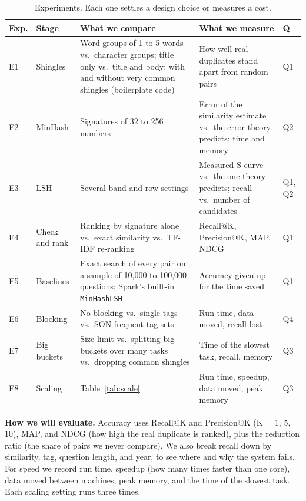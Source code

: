 \documentclass[11pt,a4paper]{article}
\begin{document}
\begin{table}[!t]
\centering
\caption{Experiments. Each one settles a design choice or measures a cost.}
\label{tab:exp}
\small
\begin{tabularx}{\textwidth}{@{}l l Y Y l@{}}
\toprule
\textbf{Exp.} & \textbf{Stage} & \textbf{What we compare} & \textbf{What we measure} & \textbf{Q} \\
\midrule
E1 & Shingles & Word groups of 1 to 5 words vs.\ character groups; title only vs.\ title and body; with and without very common shingles (boilerplate code) & How well real duplicates stand apart from random pairs & Q1 \\
E2 & MinHash & Signatures of 32 to 256 numbers & Error of the similarity estimate vs.\ the error theory predicts; time and memory & Q2 \\
E3 & LSH & Several band and row settings & Measured S-curve vs.\ the one theory predicts; recall vs.\ number of candidates & Q1, Q2 \\
E4 & Check and rank & Ranking by signature alone vs.\ exact similarity vs.\ TF-IDF re-ranking & Recall@K, Precision@K, MAP, NDCG & Q1 \\
E5 & Baselines & Exact search of every pair on a sample of 10{,}000 to 100{,}000 questions; Spark's built-in \texttt{MinHashLSH} & Accuracy given up for the time saved & Q1 \\
E6 & Blocking & No blocking vs.\ single tags vs.\ SON frequent tag sets & Run time, data moved, recall lost & Q4 \\
E7 & Big buckets & Size limit vs.\ splitting big buckets over many tasks vs.\ dropping common shingles & Time of the slowest task, recall, memory & Q3 \\
E8 & Scaling & Table~\ref{tab:scale} & Run time, speedup, data moved, peak memory & Q3 \\
\bottomrule
\end{tabularx}
\end{table}

\textbf{How we will evaluate.} Accuracy uses Recall@K and Precision@K (K = 1, 5, 10), MAP, and
NDCG (how high the real duplicate is ranked), plus the reduction ratio (the
share of pairs we never compare). We also break recall down by similarity,
tag, question length, and year, to see where and why the system fails. For
speed we record run time, speedup (how many times faster than one core),
data moved between machines, peak memory, and the time of the slowest task.
Each scaling setting runs three times.
\end{document}
